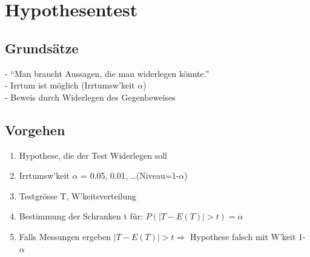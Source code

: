 \section{Hypothesentest  }
	\subsection{Grundsätze}
	- ``Man braucht Aussagen, die man widerlegen könnte.''\\
	- Irrtum ist möglich (Irrtumsw'keit $\alpha$)\\
	- Beweis durch Widerlegen des Gegenbeweises
	\subsection{Vorgehen}
	\begin{enumerate}
      \item Hypothese, die der Test Widerlegen soll
      \item Irrtumsw'keit $\alpha$ = 0.05, 0.01, \ldots (Niveau=1-$\alpha$)
      \item Testgrösse T, W'keitsverteilung
      \item Bestimmung der Schranken t für: $P(|T-E(T)|>t)=\alpha$
      \item Falls Messungen ergeben $|T-E(T)|>t \Longrightarrow$ Hypothese
      falsch mit W'keit 1- $\alpha$
    \end{enumerate}
    
    
